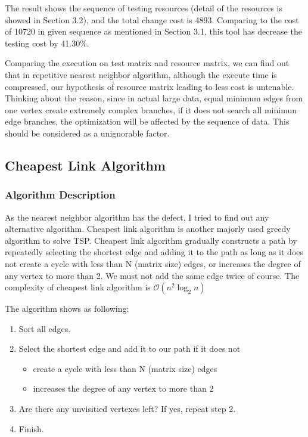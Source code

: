 \documentclass[12pt,a4paper]{article}
\begin{document}
The result shows the sequence of testing resources (detail of the resources is showed in Section 3.2), and the total change cost is 4893. Comparing to the cost of 10720 in given sequence as mentioned in Section 3.1, this tool has decrease the testing cost by 41.30\%. 

Comparing the execution on test matrix and resource matrix, we can find out that in repetitive nearest neighbor algorithm, although the execute time is compressed, our hypothesis of resource matrix leading to less cost is untenable. Thinking about the reason, since in actual large data, equal minimum edges from one vertex create extremely complex branches, if it does not search all minimun edge branches, the optimization will be affected by the sequence of data. This should be considered as a unignorable factor.

\subsection{Cheapest Link Algorithm}

\subsubsection{Algorithm Description}
As the nearest neighbor algorithm has the defect, I tried to find out any alternative algorithm. Cheapest link algorithm is another majorly used greedy algorithm to solve TSP. Cheapest link algorithm gradually constructs a path by repeatedly selecting the shortest edge and adding it to the path as long as it does not create a cycle with less than N (matrix size) edges, or increases the degree of any vertex to more than 2. We must not add the same edge twice of course. The complexity of cheapest link algorithm is $\mathcal{O}(n^2 \log_2 n)$

The algorithm shows as following:\cite{1}

\begin{enumerate}
\item Sort all edges.
\item Select the shortest edge and add it to our path if it does not
\begin{itemize}
	\item create a cycle with less than N (matrix size) edges
	\item increases the degree of any vertex to more than 2
\end{itemize} 
\item Are there any unvisitied vertexes left? If yes, repeat step 2.
\item Finish.
\end{enumerate}
\end{document}
